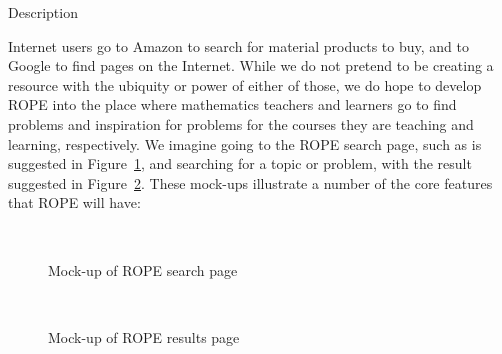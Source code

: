 \documentclass[11pt]{article}
\begin{document}
\begin{section}{Description}

Internet users go to Amazon to search for material products to buy, and to
Google to find pages on the Internet.  While we do not pretend to be
creating a resource with the ubiquity or power of either of those, we do
hope to develop ROPE into the place where mathematics teachers and
learners go to find problems and inspiration for problems for the courses
they are teaching and learning, respectively.  We imagine going to the
ROPE search page, such as is suggested in Figure~\ref{rope1}, and
searching for a topic or problem, with the result suggested in
Figure~\ref{rope2}.  These mock-ups illustrate a number of the core
features that ROPE will have:

\begin{figure}
\begin{center}
\\
\caption{Mock-up of ROPE search page}
\label{rope1}
\end{center}
\end{figure}

\begin{figure}
\begin{center}
\\
\caption{Mock-up of ROPE results page}
\label{rope2}
\end{center}
\end{figure}


\end{section}
\end{document}
